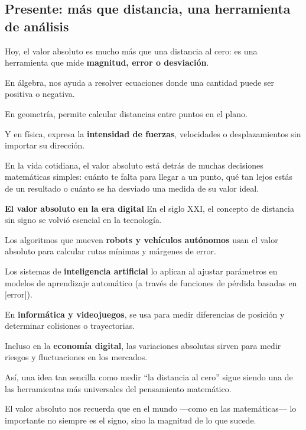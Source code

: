\begin{reseñaplana}
\section*{Presente: más que distancia, una herramienta de análisis}

Hoy, el valor absoluto es mucho más que una distancia al cero: es una herramienta que mide \textbf{magnitud, error o desviación}.  

En álgebra, nos ayuda a resolver ecuaciones donde una cantidad puede ser positiva o negativa.  

En geometría, permite calcular distancias entre puntos en el plano.  

Y en física, expresa la \textbf{intensidad de fuerzas}, velocidades o desplazamientos sin importar su dirección.  

En la vida cotidiana, el valor absoluto está detrás de muchas decisiones matemáticas simples: cuánto 
te falta para llegar a un punto, qué tan lejos estás de un resultado o cuánto se ha desviado una medida de su valor ideal.  

\textbf{El valor absoluto en la era digital}  
En el siglo XXI, el concepto de distancia sin signo se volvió esencial en la tecnología.  

Los algoritmos que mueven \textbf{robots y vehículos autónomos} usan el valor absoluto para calcular 
rutas mínimas y márgenes de error.  

Los sistemas de \textbf{inteligencia artificial} lo aplican al ajustar parámetros en modelos de aprendizaje 
automático (a través de funciones de pérdida basadas en |error|).  

En \textbf{informática y videojuegos}, se usa para medir diferencias de posición y determinar colisiones o trayectorias.  

Incluso en la \textbf{economía digital}, las variaciones absolutas sirven para medir riesgos y fluctuaciones en los mercados.  

Así, una idea tan sencilla como medir “la distancia al cero” sigue siendo una de las herramientas más 
universales del pensamiento matemático.  

El valor absoluto nos recuerda que en el mundo —como en las matemáticas— lo importante no siempre es 
el signo, sino la magnitud de lo que sucede.
\end{reseñaplana}


